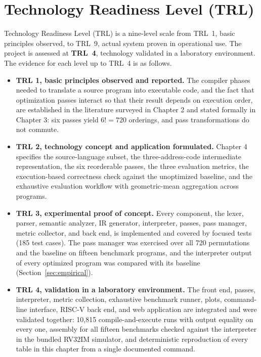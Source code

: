 \section{Technology Readiness Level (TRL)}

Technology Readiness Level (TRL) is a nine-level scale from TRL~1, basic principles observed, to TRL~9, actual system proven in operational use. The project is assessed at \textbf{TRL~4}, technology validated in a laboratory environment. The evidence for each level up to TRL~4 is as follows.

\begin{itemize}
  \item \textbf{TRL 1, basic principles observed and reported.} The compiler phases needed to translate a source program into executable code, and the fact that optimization passes interact so that their result depends on execution order, are established in the literature surveyed in Chapter 2 and stated formally in Chapter 3: six passes yield $6! = 720$ orderings, and pass transformations do not commute.
  \item \textbf{TRL 2, technology concept and application formulated.} Chapter 4 specifies the source-language subset, the three-address-code intermediate representation, the six reorderable passes, the three evaluation metrics, the execution-based correctness check against the unoptimized baseline, and the exhaustive evaluation workflow with geometric-mean aggregation across programs.
  \item \textbf{TRL 3, experimental proof of concept.} Every component, the lexer, parser, semantic analyzer, IR generator, interpreter, passes, pass manager, metric collector, and back end, is implemented and covered by focused tests (185 test cases). The pass manager was exercised over all 720 permutations and the baseline on fifteen benchmark programs, and the interpreter output of every optimized program was compared with its baseline (Section~\ref{sec:empirical}).
  \item \textbf{TRL 4, validation in a laboratory environment.} The front end, passes, interpreter, metric collection, exhaustive benchmark runner, plots, command-line interface, RISC-V back end, and web application are integrated and were validated together: 10{,}815 compile-and-execute runs with output equality on every one, assembly for all fifteen benchmarks checked against the interpreter in the bundled RV32IM simulator, and deterministic reproduction of every table in this chapter from a single documented command.
\end{itemize}

